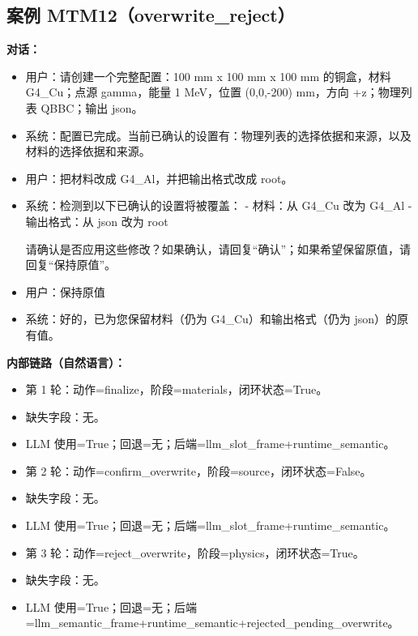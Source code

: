 \documentclass[11pt]{ctexart}
\begin{document}
\subsection{案例 MTM12（overwrite\_reject）}
\textbf{对话：}
\begin{itemize}
\item 用户：请创建一个完整配置：100 mm x 100 mm x 100 mm 的铜盒，材料 G4\_Cu；点源 gamma，能量 1 MeV，位置 (0,0,-200) mm，方向 +z；物理列表 QBBC；输出 json。
\item 系统：配置已完成。当前已确认的设置有：物理列表的选择依据和来源，以及材料的选择依据和来源。
\item 用户：把材料改成 G4\_Al，并把输出格式改成 root。
\item 系统：检测到以下已确认的设置将被覆盖：
- 材料：从 G4\_Cu 改为 G4\_Al
- 输出格式：从 json 改为 root

请确认是否应用这些修改？如果确认，请回复“确认”；如果希望保留原值，请回复“保持原值”。
\item 用户：保持原值
\item 系统：好的，已为您保留材料（仍为 G4\_Cu）和输出格式（仍为 json）的原有值。
\end{itemize}
\textbf{内部链路（自然语言）：}
\begin{itemize}
\item 第 1 轮：动作=finalize，阶段=materials，闭环状态=True。
\item 缺失字段：无。
\item LLM 使用=True；回退=无；后端=llm\_slot\_frame+runtime\_semantic。
\item 第 2 轮：动作=confirm\_overwrite，阶段=source，闭环状态=False。
\item 缺失字段：无。
\item LLM 使用=True；回退=无；后端=llm\_slot\_frame+runtime\_semantic。
\item 第 3 轮：动作=reject\_overwrite，阶段=physics，闭环状态=True。
\item 缺失字段：无。
\item LLM 使用=True；回退=无；后端=llm\_semantic\_frame+runtime\_semantic+rejected\_pending\_overwrite。
\end{itemize}
\end{document}
